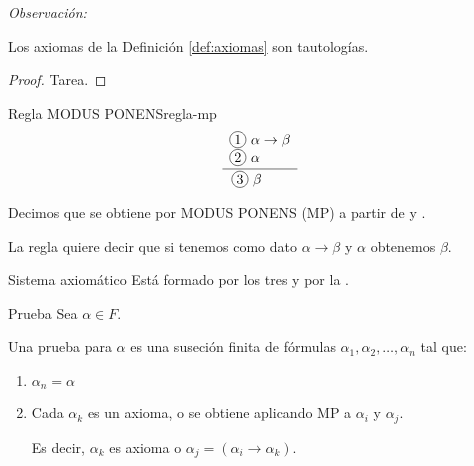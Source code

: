 \bigskip
\textit{Observación:}

Los axiomas de la Definición \ref{def:axiomas} son tautologías.

\begin{proof} \phantom{.}
    Tarea.
\end{proof}


\begin{definicion}{Regla MODUS PONENS}{regla-mp}
    \begin{equation*}
    \frac{
        \begin{array}[b]{l}
            \circled{1} ~ \alpha \to \beta \\
            \circled{2} ~ \alpha
        \end{array}
    }{
            \circled{3} ~ \beta \phantom{\to \beta}
    }
    \end{equation*}

    \medskip

    Decimos que  se obtiene por MODUS PONENS (MP) a partir
    de  y .
\end{definicion}

La regla quiere decir que si tenemos como dato $\alpha\to\beta$ y 
$\alpha$ obtenemos $\beta$.

\medskip

\begin{definicion}{Sistema axiomático}{}
    Está formado por los tres  y por la
    .
\end{definicion}


\medskip

\begin{definicion}{Prueba}{}
    Sea $\alpha \in F$.

    \medskip

    Una prueba para $\alpha$ es una suseción finita de fórmulas 
    $\alpha_1, \alpha_2, \dotsc, \alpha_n$ tal que:
    \begin{enumerate}
        \item $\alpha_n = \alpha$
        \item Cada $\alpha_k$ es un axioma, o se obtiene aplicando MP a 
            $\alpha_i$ y $\alpha_j$.

            Es decir, $\alpha_k$ es axioma o $\alpha_j = (\alpha_i \to \alpha_k)$.

    \end{enumerate}
\end{definicion}

